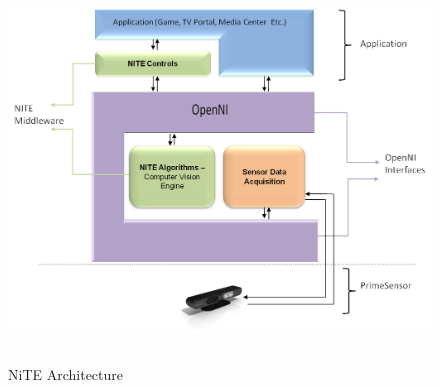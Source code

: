 \begin{figure}
	[h] \centering 
	\includegraphics[height=10cm]{figures/content/ni-arch.png} \caption{NiTE Architecture} \label{fg:ni:arch} 
\end{figure}
